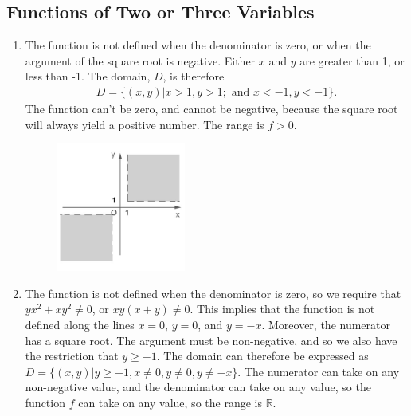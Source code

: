 \subsection{Functions of Two or Three Variables}

\BEN
\item 
\begin{enumerate}
\item The function is not defined when the denominator is zero, or when the argument of the square root is negative. Either $x$ and $y$ are greater than 1, or less than -1. The domain, $D$, is therefore
\begin{align*}D = \{(x,y)|x > 1, y > 1; \text{ and } x < -1, y < -1\}. \end{align*}
The function can't be zero, and cannot be negative, because the square root will always yield a positive number. The range is $f > 0$.  
\begin{figure}[!htbp]
  \begin{center}
    \includegraphics[width=0.4\textwidth]{Img1A.jpg}
  \end{center}
\end{figure}
\item The function is not defined when the denominator is zero, so we require that $yx^2+xy^2\ne0$, or $xy(x+y)\ne0$. This implies that the function is not defined along the lines $x=0$, $y=0$, and $y=-x$. Moreover, the numerator has a square root. The argument must be non-negative, and so we also have the restriction that $y\ge-1$. The domain can therefore be expressed as $D=\{(x,y)| y\ge -1, x\ne0, y\ne0, y\ne-x\}$. The numerator can take on any non-negative value, and the denominator can take on any value, so the function $f$ can take on any value, so the range is $\mathbb{R}$.

\end{enumerate}
